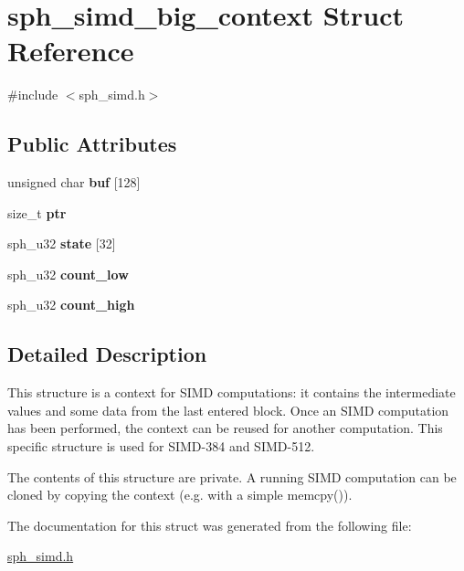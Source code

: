 \hypertarget{structsph__simd__big__context}{}\section{sph\+\_\+simd\+\_\+big\+\_\+context Struct Reference}
\label{structsph__simd__big__context}


{\ttfamily \#include $<$sph\+\_\+simd.\+h$>$}

\subsection*{Public Attributes}
\begin{DoxyCompactItemize}
\item 
\mbox{\label{structsph__simd__big__context_a4d67b9491c7243d7e372de7ca01a717f}} 
unsigned char {\bfseries buf} \mbox{[}128\mbox{]}
\item 
\mbox{\label{structsph__simd__big__context_a0f5cd2f56abcf6ab9e0a6177e970814f}} 
size\+\_\+t {\bfseries ptr}
\item 
\mbox{\label{structsph__simd__big__context_ac1948fd0308eb6281db68aaa9ee4178e}} 
sph\+\_\+u32 {\bfseries state} \mbox{[}32\mbox{]}
\item 
\mbox{\label{structsph__simd__big__context_a0869d428ed186efa3137783052da74d4}} 
sph\+\_\+u32 {\bfseries count\+\_\+low}
\item 
\mbox{\label{structsph__simd__big__context_ae7c05aa3d59f60bd4d06b6abe04e7a7b}} 
sph\+\_\+u32 {\bfseries count\+\_\+high}
\end{DoxyCompactItemize}


\subsection{Detailed Description}
This structure is a context for S\+I\+MD computations\+: it contains the intermediate values and some data from the last entered block. Once an S\+I\+MD computation has been performed, the context can be reused for another computation. This specific structure is used for S\+I\+M\+D-\/384 and S\+I\+M\+D-\/512.

The contents of this structure are private. A running S\+I\+MD computation can be cloned by copying the context (e.\+g. with a simple {\ttfamily memcpy()}). 

The documentation for this struct was generated from the following file\+:\begin{DoxyCompactItemize}
\item 
\mbox{\hyperlink{sph__simd_8h}{sph\+\_\+simd.\+h}}\end{DoxyCompactItemize}
